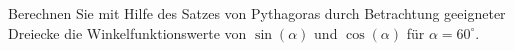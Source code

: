 \begin{ExerciseBlock}
Berechnen Sie mit Hilfe des Satzes von Pythagoras durch Betrachtung geeigneter
Dreiecke die Winkelfunktionswerte von $\sin(\alpha)$ und $\cos(\alpha)$ für $\alpha = 60^\circ$.

\end{ExerciseBlock}
